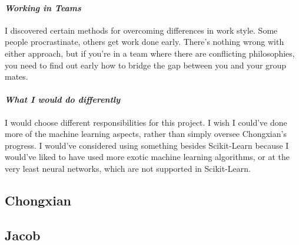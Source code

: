 \documentclass[onecolumn, draftclsnofoot,10pt, compsoc]{IEEEtran}
\begin{document}
\paragraph{\emph{Working in Teams}}
I discovered certain methods for overcoming differences in work style. Some people procrastinate, others get work done early. There’s nothing wrong with either approach, but if you’re in a team where there are conflicting philosophies, you need to find out early how to bridge the gap between you and your group mates.

\paragraph{\emph{What I would do differently}}
I would choose different responsibilities for this project. I wish I could’ve done more of the machine learning aspects, rather than simply oversee Chongxian’s progress. I would’ve considered using something besides Scikit-Learn  because I would’ve liked to have used more exotic machine learning algorithms, or at the very least neural networks, which are not supported in Scikit-Learn.


\subsection{Chongxian}
\subsection{Jacob}

\appendices
\end{document}
